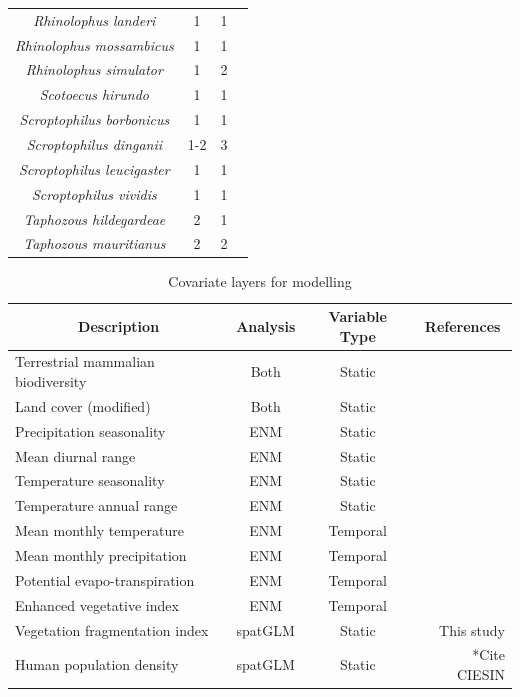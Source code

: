 \documentclass[9pt,twoside,lineno]{pnas-new}
\begin{document}
\begin{longtable}{cccp{5cm}}
\textit{Rhinolophus landeri} & 1 & 1 & \cite{Menzies1973ANigeria}\\
\textit{Rhinolophus mossambicus} & 1 & 1 & \cite{Cotterill1998FemaleZimbabwe}\\
\textit{Rhinolophus simulator} & 1 & 2 & \cite{Cotterill1998FemaleZimbabwe,OShea1980EcologicalCommunity}\\
\textit{Scotoecus hirundo} & 1 & 1 & \cite{OShea1980EcologicalCommunity}\\
\textit{Scroptophilus borbonicus} & 1 & 1 & \cite{VanderMerweN.J.Rautenbach1988AVespertilionidae}\\
\textit{Scroptophilus dinganii} & 1-2 & 3 & \cite{OShea1980EcologicalCommunity,vanderMerwe2006Aspects1833,Okia1987ReproductiveBats}\\
\textit{Scroptophilus leucigaster} & 1 & 1 & \cite{Barclay1985NoLeucogastere}\\
\textit{Scroptophilus vividis} & 1 & 1 & \cite{VanderMerweN.J.Rautenbach1988AVespertilionidae}\\
\textit{Taphozous hildegardeae} & 2 & 1 & \cite{McWilliam1988TheTropics}\\
\textit{Taphozous mauritianus} & 2 & 2 & \cite{Happold1990ReproductiveAfrica,OShea1980EcologicalCommunity}\\
\end{longtable}
\FloatBarrier

\begin{table}
\centering
\caption{Covariate layers for modelling}
\label{table:ENM_CoV}
\begin{tabular}{l c c r}
\multicolumn{1}{c}{Description} & \multicolumn{1}{c}{Analysis} & \multicolumn{1}{c}{Variable Type} & \multicolumn{1}{c}{References}\\
\hline\hline
Terrestrial mammalian biodiversity & Both & Static & \cite{IUCN2016TerrestrialData}\\
Land cover (modified) & Both & Static & \cite{Olivier2012Global2009}\\
Precipitation seasonality & ENM & Static & \cite{Frick2017WorldclimArease}\\
Mean diurnal range & ENM & Static & \cite{Frick2017WorldclimArease}\\
Temperature seasonality & ENM & Static & \cite{Frick2017WorldclimArease}\\
Temperature annual range & ENM & Static& \cite{Frick2017WorldclimArease}\\
Mean monthly temperature & ENM & Temporal & \cite{Frick2017WorldclimArease}\\
Mean monthly precipitation & ENM & Temporal & \cite{Frick2017WorldclimArease}\\
Potential evapo-transpiration & ENM & Temporal & \cite{Trabucco2009GlobalDatabase}\\
Enhanced vegetative index & ENM & Temporal & \cite{Huete2002OverviewIndices}\\
Vegetation fragmentation index & spatGLM & Static & This study \\
Human population density & spatGLM & Static & *Cite CIESIN\\
\end{tabular}
\end{table}
\FloatBarrier
\end{document}
